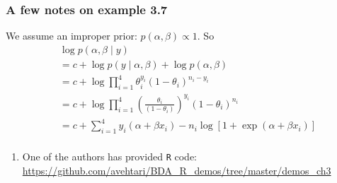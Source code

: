 \documentclass{beamer}
\begin{document}
\begin{frame}[fragile]
\frametitle{A few notes on example 3.7}

We assume an improper prior: $p(\alpha,\beta) \propto 1$. So
\begin{align*}
&\log p(\alpha,\beta \mid y) \\
&= c + \log p(y \mid \alpha, \beta) + \log p(\alpha,\beta) \\
&= c +  \log\prod_{i=1}^4 \theta_i^{y_i}(1-\theta_i)^{n_i-y_i} \\
&= c +  \log\prod_{i=1}^4 \left(\frac{\theta_i}{(1-\theta_i)}\right)^{y_i}(1-\theta_i)^{n_i} \\
&= c + \sum_{i=1}^4 y_i (\alpha + \beta x_i) - n_i\log[1 + \exp (\alpha + \beta x_i)] \\
\end{align*}


\begin{enumerate}
\item One of the authors has provided \verb|R| code: \url{https://github.com/avehtari/BDA_R_demos/tree/master/demos_ch3}
\end{enumerate}

\end{frame}
\end{document}
